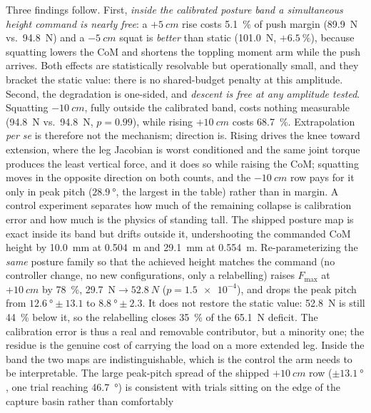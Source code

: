 \documentclass[a4paper,fleqn]{cas-dc}
\begin{document}
Three findings follow.
First, \emph{inside the calibrated posture band a simultaneous height command is
nearly free}: a ${+}\SI{5}{cm}$ rise costs \SI{5.1}{\percent} of push margin
(\SI{89.9}{N} vs.\ \SI{94.8}{N}) and a ${-}\SI{5}{cm}$ squat is
\emph{better} than static (\SI{101.0}{N}, $+\SI{6.5}{\percent}$), because
squatting lowers the CoM and shortens the toppling moment arm while the push
arrives. Both effects are statistically resolvable but operationally small,
and they bracket the static value: there is no shared-budget penalty at this
amplitude.
Second, the degradation is one-sided, and \emph{descent is free at any
amplitude tested}. Squatting ${-}\SI{10}{cm}$, fully outside the calibrated band, costs nothing measurable (\SI{94.8}{N} vs.\ \SI{94.8}{N}, $p{=}0.99$),
while rising ${+}\SI{10}{cm}$ costs \SI{68.7}{\percent}. Extrapolation
\emph{per se} is therefore not the mechanism; direction is. Rising drives the
knee toward extension, where the leg Jacobian is worst conditioned and the same
joint torque produces the least vertical force, and it does so while raising the
CoM; squatting moves in the opposite direction on both counts, and the
${-}\SI{10}{cm}$ row pays for it only in peak pitch ($\SI{28.9}{\degree}$, the
largest in the table) rather than in margin.
A control experiment separates how much of the remaining collapse is
calibration error and how much is the physics of standing tall. The shipped
posture map is exact inside its band but drifts outside it, undershooting the
commanded CoM height by \SI{10.0}{mm} at \SI{0.504}{m} and \SI{29.1}{mm} at
\SI{0.554}{m}. Re-parameterizing the \emph{same} posture family so that the
achieved height matches the command (no controller change, no new configurations, only a relabelling) raises $F_{\max}$ at ${+}\SI{10}{cm}$ by
\SI{78}{\percent}, \SI{29.7}{N}${\rightarrow}\SI{52.8}{N}$
($p{=}\num{1.5e-4}$), and drops the peak pitch from
$\SI{12.6}{\degree}{\pm}13.1$ to $\SI{8.8}{\degree}{\pm}2.3$. It does not
restore the static value: \SI{52.8}{N} is still \SI{44}{\percent} below it, so
the relabelling closes \SI{35}{\percent} of the \SI{65.1}{N} deficit. The
calibration error is thus a real and removable contributor, but a minority one;
the residue is the genuine cost of carrying the load on a more extended leg. Inside the band the two maps are
indistinguishable, which is the control the arm needs to be interpretable.
The large peak-pitch spread of the shipped ${+}\SI{10}{cm}$ row
($\pm\SI{13.1}{\degree}$, one trial reaching \SI{46.7}{\degree}) is consistent
with trials sitting on the edge of the capture basin rather than comfortably
\end{document}

